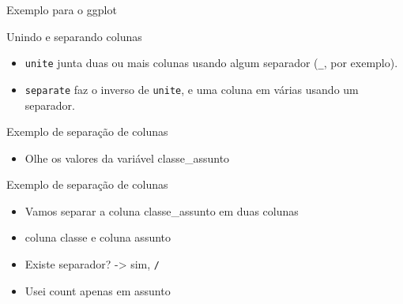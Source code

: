 \documentclass[
  10pt,
  ignorenonframetext,
]{beamer}
\providecommand{\tightlist}{%
  \setlength{\itemsep}{0pt}\setlength{\parskip}{0pt}}
\begin{document}
\begin{frame}{Exemplo para o ggplot}
\protect\hypertarget{exemplo-para-o-ggplot}{}
\end{frame}

\begin{frame}[fragile]{Unindo e separando colunas}
\protect\hypertarget{unindo-e-separando-colunas}{}
\begin{itemize}
\tightlist
\item
  \texttt{unite} junta duas ou mais colunas usando algum separador
  (\texttt{\_}, por exemplo).
\item
  \texttt{separate} faz o inverso de \texttt{unite}, e uma coluna em
  várias usando um separador.
\end{itemize}
\end{frame}

\begin{frame}{Exemplo de separação de colunas}
\protect\hypertarget{exemplo-de-separauxe7uxe3o-de-colunas}{}
\begin{itemize}
\tightlist
\item
  Olhe os valores da variável classe\_assunto
\end{itemize}
\end{frame}

\begin{frame}[fragile]{Exemplo de separação de colunas}
\protect\hypertarget{exemplo-de-separauxe7uxe3o-de-colunas-1}{}
\begin{itemize}
\item
  Vamos separar a coluna classe\_assunto em duas colunas
\item
  coluna classe e coluna assunto
\item
  Existe separador? -\textgreater{} sim, \texttt{/}
\item
  Usei count apenas em assunto
\end{itemize}
\end{frame}
\end{document}
